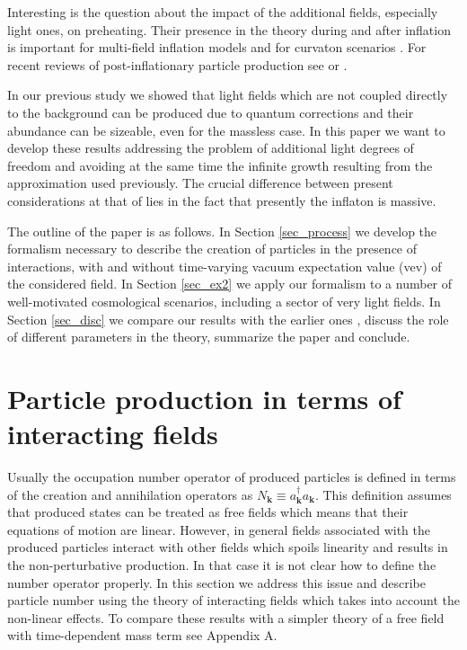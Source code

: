 \documentclass[twocolumn,showpacs,preprintnumbers,amsmath,amssymb,nofootinbib,superscriptaddress,prc]{revtex4}
\begin{document}
Interesting is the question about the impact of the additional fields, especially light ones, on preheating. Their presence in the theory during \cite{Kobayashi:2010fm, Matsuda:2012kk, Kohri:2014jma} and after inflation is important for multi-field inflation models and for curvaton scenarios \cite{Enqvist:2001zp, Lyth:2001nq, Moroi:2001ct}. For recent reviews of post-inflationary particle production see \cite{Allahverdi:2010xz} or \cite{Amin:2014eta}. 

In our previous study \cite{Enomoto:2014cna} we showed that light fields which are not coupled directly to the background can be produced due to quantum corrections and their abundance can be sizeable, even for the massless case. In this paper we want to develop these results addressing the problem of additional light degrees of freedom and avoiding at the same time the infinite growth resulting from the approximation used previously. The crucial difference between present considerations at that of \cite{Enomoto:2014cna} lies in the fact that presently the inflaton is massive.

The outline of the paper is as follows. In Section \ref{sec_process} we develop the formalism necessary to describe the creation of particles in the presence of interactions, with and without time-varying vacuum expectation value (vev) of the considered field. In Section \ref{sec_ex2} we apply our formalism to a number of well-motivated cosmological scenarios, including a sector of very light fields. In Section \ref{sec_disc} we compare our results with the earlier ones \cite{Enomoto:2014cna}, discuss the role of different parameters in the theory, summarize the paper and conclude.


\section{Particle production in terms of interacting fields \label{sec_process}}

Usually the occupation number operator of produced particles is defined in terms of the creation and annihilation operators as $N_{\mathbf{k}}\equiv a_{\mathbf{k}}^\dagger a_{\mathbf{k}}$.  This definition assumes that produced states can be treated as free fields which means that their equations of motion are linear. However, in general fields associated with the produced particles interact with other fields which spoils linearity and results in the non-perturbative production. In that case it is not clear how to define the number operator properly. In this section we address this issue and describe particle number using the theory of interacting fields which takes into account the non-linear effects. To compare these results with a simpler theory of a free field with time-dependent mass term see Appendix A.
\end{document}
